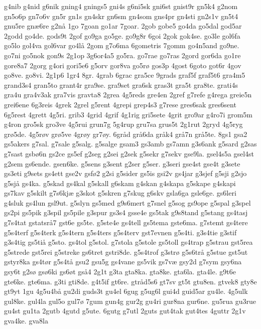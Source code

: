 {g4nib
g4nid
g6nik
gning4
gnings5
gni4s
g6ni5sk
gni6st
gnist9r
gn5k4
g2nom
gn5o6p
gn7o6v
gn5r
gn1s
gn4skr
gn6sm
gn4som
gns4pr
gn4sti
gn2s1v
gn5t4
gnu5re
gn^^e66re
g2n^^e5
1go
7goan
go1ar
7goar.
2gob
gobe5
go4da
go5dal
god5ar
2godd
go4de.
gods9t
2gof
go9ga
go5ge.
go9g8r
6goi
2gok
gok4se.
go3le
gol6fa
go5lo
gol4va
gol6var
go4l^^e5
2gom
g7o6ma
6gometris
7gomm
go4n5and
go9ne.
go7ni
go5nok
gon9s
2g1op
3g6or4a5
go5ra.
go7rae
go7ras
2gord
gor6da
go1re
gore8a7
2gorg
g4ori
gori5e6
g5orv
gor8va
go5r^^f8
gos3p
4gost
6goto
got6r
4gov
go8ve.
go8vi.
2g1p6
1gr4
8gr.
4grab
6grac
gra5ce
9grads
graf5f
graf5t6
gra4m5
grand3s4
gran5to
grant4r
gra9se.
gra9set
gra6sk
gras3t
gra5t
gra8te.
grati4s
gra4u
gra4v3ak
gra7vis
gravta8
2grea
4g5reds
gre4en
2gref
g7refe
g4rega
greie5n
grei6ene
6g3reis
4grek
2grel
g5rent
4grepi
grep4s3
g7rese
gres6sak
gres6sent
6g5rest
4grett
4g5ri.
grib3
4grid
4grif
4g1rig
gri5sete
4grit
gro9ar
g4ro7i
grom5m
g4ron
gro5sk
gro3ve
4g5rui
grun7g
5g4rup
gru7sa
grus5t
2g1rut
2gryd
4g5ryg
gr^^f85de.
4g5r^^f8v
gr^^f85ve
4gr^^f8y
gr7^^f8y.
6gr^^e5d
gr^^e56da
gr^^e5k4
gr^^e57n
gr^^e55te.
8gs1
gsa2
gs5akers
g7sal.
g7sale
g5salg.
g5salge
gsam3
gs3amb
gs7amn
g3s6ank
g5sard
g2sas
g7sast
gsb^^f86n
gs2ce
gs5ef
g2seg
g2sei
g2sek
g5sekr
g7sekv
gse9la.
gsel4s5a
gsel4st
g2sem
gs6ende.
gsen6ke.
g5sens
g3sent
g2ser
g5ser.
g3seri
gse4st
gse4t
g3sete
gs3eti
g9sets
gs4ett
gse2v
gsf^^f82
g2si
g5sider
gs5is
gsi2v
gs4jar
g3sjef
g5sji
g2sjo
g5sj^^e5
gs4ka.
g5skad
gs4kal
g5skall
g6skam
g4skan
g4skapa
g5skape
g4skapi
gs7kav
g5skilt
g7s6kj^^e6
g3skot
g5skren
g7skug
g6skv
gsla6ga
gsle6ge.
gs6leri
g4sluk
gs4lun
gsl9ut.
g5slyn
gs5med
g9s6mert
g7snel
g5sog
gs9ope
g5spal
g3spel
gs2pi
gs5pik
g3spil
gs5pile
g3spur
gs3s4
gsse4e
gs5tak
g9s8tand
g5stang
gs4tasj
g7s4tat
gstatsr^^e57
gst6e
gs5te.
g5ste4e
gs4tell
gs5tema
gste6ma.
g7stemt
gs4tere
g5s4terf
g5s4terk
g5s4tern
g5s4ters
g5s4terv
gst7evnen
g5s4ti.
g3s4tie
g3stif
g3s4tig
gs5ti^^e5
g5sto.
gs4tol
g5stol.
g7stola
g5stole
gs5toll
gs4trap
g5strau
gst5rea
g5strede
gst5rei
g5streke
gs6tret
gstri8de.
g5s4trof
g3str^^f8
g5s6tr^^e5
g5stue
gst5ut
gstyr8ka
gs4t^^f8r
g5s4t^^e5
gsu2
gsu5g
gs4vane
gs5vik
gs7v^^e6
gsy2d
g7sym
gsy6na
gsy6t
g2s^^f8
gs^^f86ki
gs6^^f8t
gs^^e54
2g1t
g3ta
gta8ka.
gta8ke.
gta6la.
gta4le.
g9t6e
gte6ke.
gte6ma.
g3ti
gti8de.
g4t5if
gt6re.
gtr^^e5d5s6
gt7sv
gt5t
gtu8en.
gtvek8
gty8e
gt9yt
1gu
4g5u4b^^e5
gu2di
guds3t
gu4el
6gug
g5ug6l
gui4d
guid5ar
gu4le.
4g5ulk
gul8ke.
gul4la
gul5o
gul7^^f8
7gum
gun4g
gur2g
gu4ri
gur8na
gur6ne.
gu5rua
gu3rue
gu4st
gu1ta
2gutb
4gutd
g5ute.
6gutg
g7utl
2guts
gut4tak
gut4tes
4guttr
2g1v
gva4ke.
gva8la
}
